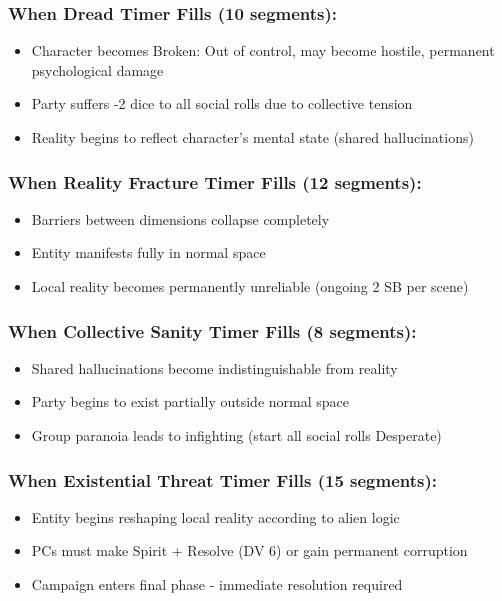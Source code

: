\documentclass[11pt]{article}
\begin{document}
\subsubsection{When Dread Timer Fills (10 segments):}
\begin{itemize}
\item Character becomes Broken: Out of control, may become hostile, permanent psychological damage
\item Party suffers -2 dice to all social rolls due to collective tension
\item Reality begins to reflect character's mental state (shared hallucinations)
\end{itemize}

\subsubsection{When Reality Fracture Timer Fills (12 segments):}
\begin{itemize}
\item Barriers between dimensions collapse completely
\item Entity manifests fully in normal space
\item Local reality becomes permanently unreliable (ongoing 2 SB per scene)
\end{itemize}

\subsubsection{When Collective Sanity Timer Fills (8 segments):}
\begin{itemize}
\item Shared hallucinations become indistinguishable from reality
\item Party begins to exist partially outside normal space
\item Group paranoia leads to infighting (start all social rolls Desperate)
\end{itemize}

\subsubsection{When Existential Threat Timer Fills (15 segments):}
\begin{itemize}
\item Entity begins reshaping local reality according to alien logic
\item PCs must make Spirit + Resolve (DV 6) or gain permanent corruption
\item Campaign enters final phase - immediate resolution required
\end{itemize}
\end{document}

